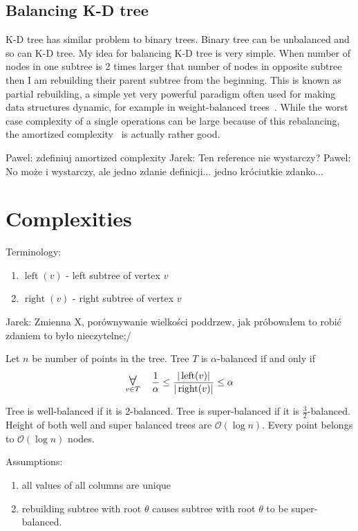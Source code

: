 \documentclass[10pt,a4paper]{article}
\newcommand{\pawel}[1]{\noindent\colorbox{myRed}{Pawel: #1}}
\newcommand{\jarek}[1]{\noindent\colorbox{myYellow}{Jarek: #1}}
\DeclareMathOperator{\rightSon}{right}
\DeclareMathOperator{\leftSon}{left}
\newcommand{\Oh}{\mathcal{O}}
\newcommand\bigforall{\mbox{\Large $\mathsurround0pt\forall$}}
\begin{document}
\subsection{Balancing K-D tree}
K-D tree has similar problem to binary trees. Binary tree can be unbalanced and so can K-D tree. My idea for balancing K-D tree is very simple. When number of nodes in one subtree is 2 times larger that number of nodes in opposite subtree then I am rebuilding their parent subtree from the beginning.
This is known as partial rebuilding, a simple yet very powerful paradigm often used for making data structures dynamic, for example in weight-balanced trees~\cite{ALPHATREES}. While the worst case complexity of a single operations can be large because of this rebalancing, the amortized complexity~\cite{AMOR} is actually rather good.

\pawel{zdefiniuj amortized complexity}
\jarek{Ten reference nie wystarczy?}
\pawel{No może i wystarczy, ale jedno zdanie definicji... jedno króciutkie zdanko...}


\section{Complexities}

Terminology:
\begin{enumerate}
\item $\leftSon(v)$ - left subtree of vertex $v$
\item $\rightSon(v)$ - right subtree of vertex $v$
\end{enumerate}

\jarek{Zmienna X, porównywanie wielkości poddrzew, jak próbowałem to robić zdaniem to było nieczytelne;/}

Let $n$ be number of points in the tree. Tree $T$ is $\alpha$-balanced if and only if 
$$\displaystyle\mathop{\bigforall}_{v\in T} \quad \frac{1}{\alpha} \leq \frac{|\leftSon(v)|}{|\rightSon(v)|} \leq \alpha$$

Tree is well-balanced if it is 2-balanced. Tree is super-balanced if it is  $\frac{3}{2}$-balanced. Height of both well and super balanced trees are $\Oh(\log n)$. Every point belongs to $\Oh(\log n)$ nodes. 

Assumptions:
\begin{enumerate}
\item all values of all columns are unique
\item rebuilding subtree with root $\theta$ causes subtree with root $\theta$ to be super-balanced.
\end{enumerate}
\end{document}
